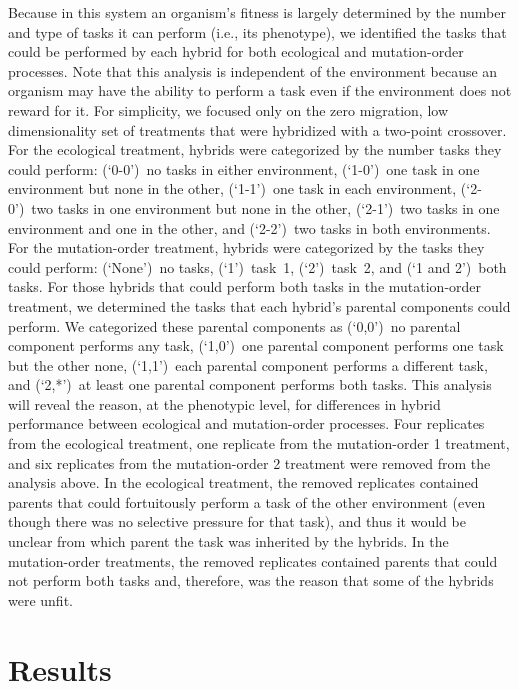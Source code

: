 \begin{doublespace}
Because in this system an organism's fitness is largely determined
by the number and type of tasks it can perform (i.e., its phenotype),
we identified the tasks that could be performed by each hybrid
for both ecological and mutation-order processes.
%
Note that this analysis is independent of the environment
because an organism may have the ability to perform a task
even if the environment does not reward for it.
%
For simplicity, we focused only on
the zero migration, low dimensionality set of treatments
that were hybridized with a two-point crossover.
%
For the ecological treatment,
hybrids were categorized by the number tasks they could perform:
(`\mbox{0-0}')~no tasks in either environment,
(`\mbox{1-0}')~one task in one environment but none in the other,
(`\mbox{1-1}')~one task in each environment,
(`\mbox{2-0}')~two tasks in one environment but none in the other,
(`\mbox{2-1}')~two tasks in one environment and one in the other,
and (`\mbox{2-2}')~two tasks in both environments.
%
For the mutation-order treatment,
hybrids were categorized by the tasks they could perform:
(`None')~no tasks,
(`1')~task~1,
(`2')~task~2,
and (`1 and 2')~both tasks.
%
For those hybrids that could perform both tasks
in the mutation-order treatment,
we determined the tasks that each hybrid's parental components could perform.
%
We categorized these parental components as
(`0,0')~no parental component performs any task,
(`1,0')~one parental component performs one task but the other none,
(`1,1')~each parental component performs a different task,
and (`2,*')~at least one parental component performs both tasks.
%
This analysis will reveal the reason, at the phenotypic level,
for differences in hybrid performance between ecological
and mutation-order processes.
%
Four replicates from the ecological treatment,
one replicate from the mutation-order 1 treatment,
and six replicates from the mutation-order 2 treatment
were removed from the analysis above.
%
In the ecological treatment, the removed replicates contained parents
that could fortuitously perform a task of the other environment
(even though there was no selective pressure for that task),
and thus it would be unclear from which parent the task was inherited
by the hybrids.
%
In the mutation-order treatments, the removed replicates contained parents
that could not perform both tasks and, therefore, was the reason
that some of the hybrids were unfit.



\section{Results}


\end{doublespace}
